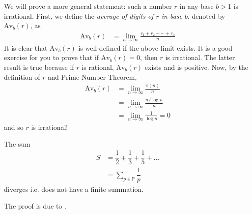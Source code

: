 \begin{solution}
	We will prove a more general statement: such a number $r$ in any base $b>1$ is irrational. First, we define the \textit{average of digits of $r$ in base $b$}, denoted by $\text{Av}_b(r)$, as
	\begin{align*}
		\text{Av}_b(r) &= \lim_{n\to \infty} \frac{r_1+r_2+\cdots+r_n}{n}
	\end{align*}
	It is clear that $\text{Av}_b(r)$ is well-defined if the above limit exists. It is a good exercise for you to prove that if $\text{Av}_b(r)=0$, then $r$ is irrational. The latter result is true because if $r$ is rational, $\text{Av}_b(r)$ exists and is positive. Now, by the definition of $r$ and Prime Number Theorem,
	\begin{align*}
	\text{Av}_b(r)
		& = \lim_{n\to \infty} \frac{\pi(n)}{n}\\
		& =  \lim_{n\to \infty} \frac{n/\log n}{n}\\
		& =  \lim_{n\to \infty} \frac{1}{\log n} = 0
	\end{align*}
	and so $r$ is irrational!
\end{solution}
	\begin{theorem}[Euler]
		The sum
			\begin{align*}
				S
					& =\dfrac{1}{2}+\dfrac{1}{3}+\dfrac{1}{5}+\ldots\\
					& =\sum\limits_{p\in\mathbb{P} }\dfrac{1}{p}
			\end{align*}
		diverges i.e. does not have a finite summation.
	\end{theorem}
The proof is due to \textcite{mixon_2013}.
